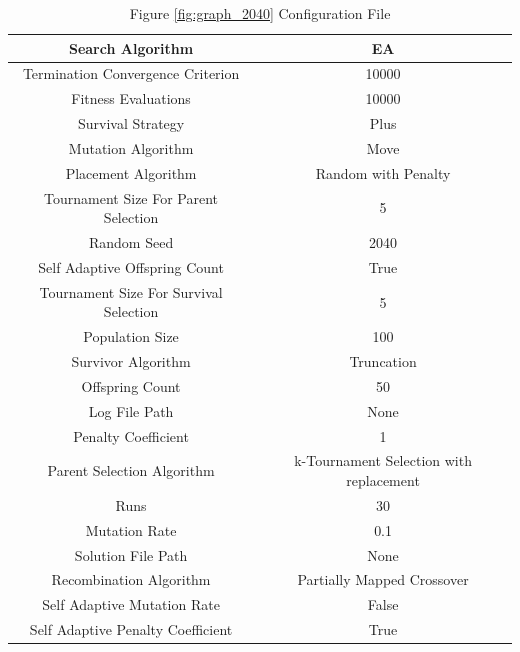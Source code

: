 \documentclass{standalone}
\begin{document}
\begin{table}[!htb]
	\centering
	\caption{Figure \ref{fig:graph_2040} Configuration File}
	\label{tab:graph_2040}
	\begin{tabular}{| c | c |}
		\hline
		Search Algorithm		& EA		 \\
		\hline
		Termination Convergence Criterion		& 10000		 \\
		\hline
		Fitness Evaluations		& 10000		 \\
		\hline
		Survival Strategy		& Plus		 \\
		\hline
		Mutation Algorithm		& Move		 \\
		\hline
		Placement Algorithm		& Random with Penalty		 \\
		\hline
		Tournament Size For Parent Selection		& 5		 \\
		\hline
		Random Seed		& 2040		 \\
		\hline
		Self Adaptive Offspring Count		& True		 \\
		\hline
		Tournament Size For Survival Selection		& 5		 \\
		\hline
		Population Size		& 100		 \\
		\hline
		Survivor Algorithm		& Truncation		 \\
		\hline
		Offspring Count		& 50		 \\
		\hline
		Log File Path		& None		 \\
		\hline
		Penalty Coefficient		& 1		 \\
		\hline
		Parent Selection Algorithm		& k-Tournament Selection with replacement		 \\
		\hline
		Runs		& 30		 \\
		\hline
		Mutation Rate		& 0.1		 \\
		\hline
		Solution File Path		& None		 \\
		\hline
		Recombination Algorithm		& Partially Mapped Crossover		 \\
		\hline
		Self Adaptive Mutation Rate		& False		 \\
		\hline
		Self Adaptive Penalty Coefficient		& True		 \\
		\hline
	\end{tabular}
\end{table}
\end{document}
